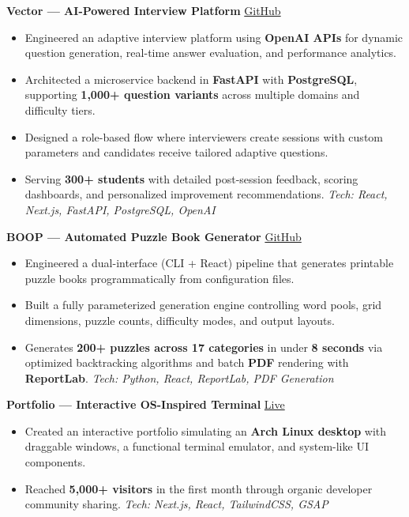 \documentclass[a4paper,10pt]{article}
\begin{document}
\vspace{1mm}

\textbf{Vector — AI-Powered Interview Platform} \quad
\href{https://github.com/Muneer320/Vector}{GitHub}
\begin{itemize}[leftmargin=2.2em]
    \item Engineered an adaptive interview platform using \textbf{OpenAI APIs} for dynamic question generation, real-time answer evaluation, and performance analytics.
    \item Architected a microservice backend in \textbf{FastAPI} with \textbf{PostgreSQL}, supporting \textbf{1,000+ question variants} across multiple domains and difficulty tiers.
    \item Designed a role-based flow where interviewers create sessions with custom parameters and candidates receive tailored adaptive questions.
    \item Serving \textbf{300+ students} with detailed post-session feedback, scoring dashboards, and personalized improvement recommendations.
    \textit{Tech: React, Next.js, FastAPI, PostgreSQL, OpenAI}
\end{itemize}

\vspace{1mm}

\textbf{BOOP — Automated Puzzle Book Generator} \quad
\href{https://github.com/Muneer320/BOOP}{GitHub}
\begin{itemize}[leftmargin=2.2em]
    \item Engineered a dual-interface (CLI + React) pipeline that generates printable puzzle books programmatically from configuration files.
    \item Built a fully parameterized generation engine controlling word pools, grid dimensions, puzzle counts, difficulty modes, and output layouts.
    \item Generates \textbf{200+ puzzles across 17 categories} in under \textbf{8 seconds} via optimized backtracking algorithms and batch \textbf{PDF} rendering with \textbf{ReportLab}.
    \textit{Tech: Python, React, ReportLab, PDF Generation}
\end{itemize}

\vspace{1mm}

\textbf{Portfolio — Interactive OS-Inspired Terminal} \quad
\href{https://muneer320.tech}{Live}
\begin{itemize}[leftmargin=2.2em]
    \item Created an interactive portfolio simulating an \textbf{Arch Linux desktop} with draggable windows, a functional terminal emulator, and system-like UI components.
    \item Reached \textbf{5,000+ visitors} in the first month through organic developer community sharing.
    \textit{Tech: Next.js, React, TailwindCSS, GSAP}
\end{itemize}
\end{document}
